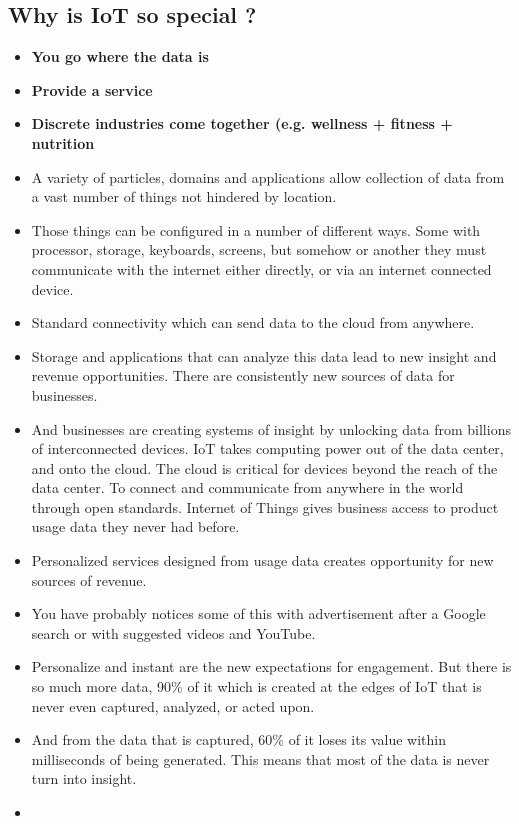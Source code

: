 \documentclass[11pt, twoside]{article}   	%
\begin{document}
\subsection{Why is IoT so special ?}
\begin{itemize}
\item \textbf{You go where the data is}
\item \textbf{Provide a service}
\item \textbf{Discrete industries come together (e.g. wellness + fitness + nutrition}
\item A variety of particles, domains and applications allow collection of data from a vast number of things not hindered by location. 
\item Those things can be configured in a number of different ways. Some with processor, storage, keyboards, screens, but somehow or another they must communicate with the internet either directly, or via an internet connected device. 
\item Standard connectivity which can send data to the cloud from anywhere. 
\item Storage and applications that can analyze this data lead to new insight and revenue opportunities. There are consistently new sources of data for businesses. 
\item And businesses are creating systems of insight by unlocking data from billions of interconnected devices. IoT takes computing power out of the data center, and onto the cloud. The cloud is critical for devices beyond the reach of the data center. To connect and communicate from anywhere in the world through open standards. Internet of Things gives business access to product usage data they never had before. 
\item Personalized services designed from usage data creates opportunity for new sources of revenue. 
\item You have probably notices some of this with advertisement after a Google search or with suggested videos and YouTube. \item Personalize and instant are the new expectations for engagement. But there is so much more data, 90\% of it which is created at the edges of IoT that is never even captured, analyzed, or acted upon. 
\item And from the data that is captured, 60\% of it loses its value within milliseconds of being generated. This means that most of the data is never turn into insight.
\item 


\end{itemize}
\end{document}
